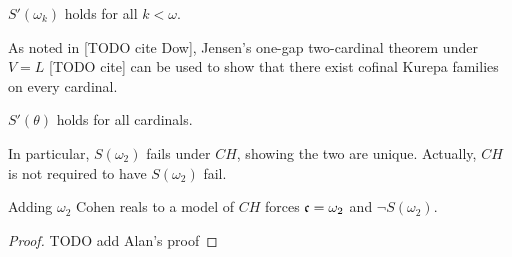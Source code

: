\documentclass[11pt]{article}
\begin{document}
  \begin{corollary}
    \(S'(\omega_k)\) holds for all \(k<\omega\).
  \end{corollary}

  As noted in [TODO cite Dow],
  Jensen's one-gap two-cardinal theorem under \(V=L\) [TODO cite] can be used
  to show that there exist cofinal Kurepa families on every cardinal.

  \begin{corollary}[\(V=L\)]
    \(S'(\theta)\) holds for all cardinals.
  \end{corollary}

  In particular, \(S(\omega_2)\) fails under \(CH\), showing the two are
  unique. Actually, \(CH\) is not required to have \(S(\omega_2)\) fail.


  \begin{theorem}
    Adding \(\omega_2\) Cohen reals to a model of \(CH\) forces
    \(\mathfrak{c}=\omega_2\) and \(\neg S(\omega_2)\).
  \end{theorem}

  \begin{proof}
    TODO add Alan's proof
  \end{proof}
\end{document}
